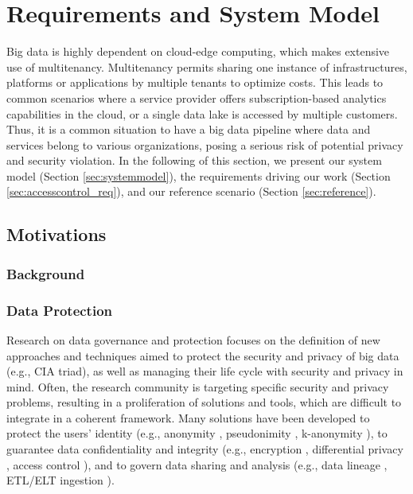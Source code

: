
\section{Requirements and System Model}\label{sec:requirements}
Big data is highly dependent on cloud-edge computing, which makes extensive use of multitenancy.
Multitenancy permits sharing one instance of infrastructures, platforms or applications by multiple tenants to optimize costs.
This leads to common scenarios where a service provider offers subscription-based analytics capabilities in the cloud,
or a single data lake is accessed by multiple customers.
Thus, it is a common situation to have a big data pipeline where data and services belong to various organizations,
posing a serious risk of potential privacy and security violation.
In the following of this section,
we present our system model (Section \ref{sec:systemmodel}),
the requirements driving our work (Section \ref{sec:accesscontrol_req}),
and our reference scenario (Section \ref{sec:reference}).
\subsection{Motivations}
\subsubsection{Background}
\subsubsection{Data Protection}
Research on data governance and protection focuses on the definition of new approaches and techniques aimed to protect the security and privacy of big data (e.g., CIA triad), as well as managing their life cycle with security and privacy in mind. Often, the research community is targeting specific security and privacy problems, resulting in a proliferation of solutions and tools, which are difficult to integrate in a coherent framework. Many solutions have been developed to protect the users' identity (e.g., anonymity \cite{wallace1999anonymity}, pseudonimity \cite{pfitzmann2001pseudonymity}, k-anonymity \cite{k-anon}), to guarantee data confidentiality and integrity (e.g., encryption \cite{thambiraja2012survey}, differential privacy \cite{hassan2019differential}, access control \cite{tolone2005access,servos2017current}), and to govern data sharing and analysis (e.g., data lineage \cite{woodruff1997supporting}, ETL/ELT ingestion \cite{vassiliadis2009survey}).

